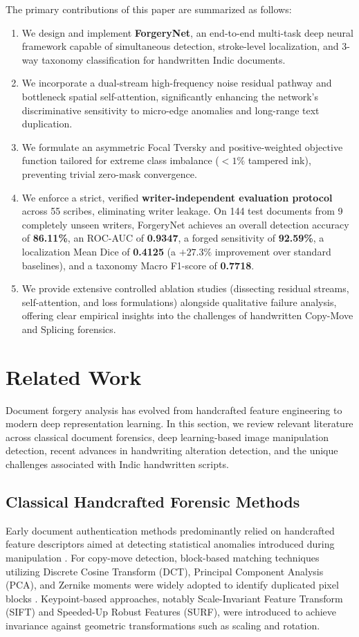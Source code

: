 \documentclass[pdflatex,sn-mathphys-num,iicol]{sn-jnl}
\begin{document}
\noindent
The primary contributions of this paper are summarized as follows:
\begin{enumerate}[1.]
    \item We design and implement \textbf{ForgeryNet}, an end-to-end multi-task deep neural framework capable of simultaneous detection, stroke-level localization, and 3-way taxonomy classification for handwritten Indic documents.
    \item We incorporate a dual-stream high-frequency noise residual pathway and bottleneck spatial self-attention, significantly enhancing the network's discriminative sensitivity to micro-edge anomalies and long-range text duplication.
    \item We formulate an asymmetric Focal Tversky and positive-weighted objective function tailored for extreme class imbalance ($<1\%$ tampered ink), preventing trivial zero-mask convergence.
    \item We enforce a strict, verified \textbf{writer-independent evaluation protocol} across 55 scribes, eliminating writer leakage. On 144 test documents from 9 completely unseen writers, ForgeryNet achieves an overall detection accuracy of \textbf{86.11\%}, an ROC-AUC of \textbf{0.9347}, a forged sensitivity of \textbf{92.59\%}, a localization Mean Dice of \textbf{0.4125} (a $+27.3\%$ improvement over standard baselines), and a taxonomy Macro F1-score of \textbf{0.7718}.
    \item We provide extensive controlled ablation studies (dissecting residual streams, self-attention, and loss formulations) alongside qualitative failure analysis, offering clear empirical insights into the challenges of handwritten Copy-Move and Splicing forensics.
\end{enumerate}

\section{Related Work}\label{sec2}

Document forgery analysis has evolved from handcrafted feature engineering to modern deep representation learning. In this section, we review relevant literature across classical document forensics, deep learning-based image manipulation detection, recent advances in handwriting alteration detection, and the unique challenges associated with Indic handwritten scripts.

\subsection{Classical Handcrafted Forensic Methods}\label{subsec2_1}
Early document authentication methods predominantly relied on handcrafted feature descriptors aimed at detecting statistical anomalies introduced during manipulation \cite{bib1}. For copy-move detection, block-based matching techniques utilizing Discrete Cosine Transform (DCT), Principal Component Analysis (PCA), and Zernike moments were widely adopted to identify duplicated pixel blocks \cite{bib1}. Keypoint-based approaches, notably Scale-Invariant Feature Transform (SIFT) and Speeded-Up Robust Features (SURF), were introduced to achieve invariance against geometric transformations such as scaling and rotation.
\end{document}
